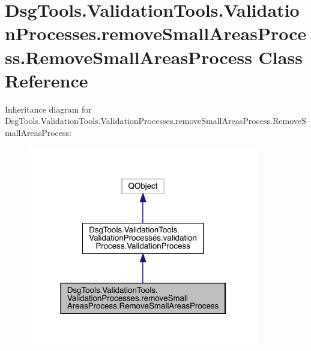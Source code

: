 \hypertarget{class_dsg_tools_1_1_validation_tools_1_1_validation_processes_1_1remove_small_areas_process_1_1_remove_small_areas_process}{}\section{Dsg\+Tools.\+Validation\+Tools.\+Validation\+Processes.\+remove\+Small\+Areas\+Process.\+Remove\+Small\+Areas\+Process Class Reference}
\label{class_dsg_tools_1_1_validation_tools_1_1_validation_processes_1_1remove_small_areas_process_1_1_remove_small_areas_process}


Inheritance diagram for Dsg\+Tools.\+Validation\+Tools.\+Validation\+Processes.\+remove\+Small\+Areas\+Process.\+Remove\+Small\+Areas\+Process\+:
\nopagebreak
\begin{figure}[H]
\begin{center}
\leavevmode
\includegraphics[width=286pt]{class_dsg_tools_1_1_validation_tools_1_1_validation_processes_1_1remove_small_areas_process_1_1_4a5f9a7b4cf32f3192c48cc8b3a75efe}
\end{center}
\end{figure}


